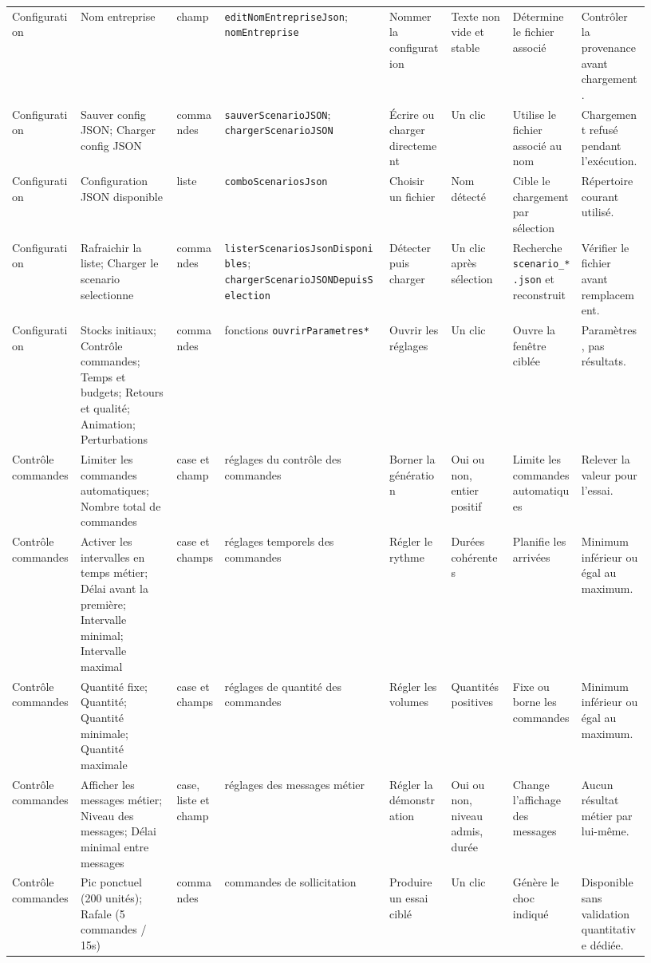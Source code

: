 \begin{landscape}
{\begin{longtable}{L{0.10\linewidth} L{0.14\linewidth} L{0.07\linewidth} L{0.24\linewidth} L{0.09\linewidth} L{0.09\linewidth} L{0.10\linewidth} L{0.10\linewidth}}
Configuration & Nom entreprise & champ & \texttt{editNomEntrepriseJson}; \texttt{nomEntreprise} & Nommer la configuration & Texte non vide et stable & Détermine le fichier associé & Contrôler la provenance avant chargement. \\
Configuration & Sauver config JSON; Charger config JSON & commandes & \texttt{sauverScenarioJSON}; \texttt{chargerScenarioJSON} & Écrire ou charger directement & Un clic & Utilise le fichier associé au nom & Chargement refusé pendant l'exécution. \\
Configuration & Configuration JSON disponible & liste & \texttt{comboScenariosJson} & Choisir un fichier & Nom détecté & Cible le chargement par sélection & Répertoire courant utilisé. \\
Configuration & Rafraichir la liste; Charger le scenario selectionne & commandes & \texttt{listerScenariosJsonDisponibles}; \texttt{chargerScenarioJSONDepuisSelection} & Détecter puis charger & Un clic après sélection & Recherche \texttt{scenario\_}\allowbreak\texttt{*.json} et reconstruit & Vérifier le fichier avant remplacement. \\

Configuration & Stocks initiaux; Contrôle commandes; Temps et budgets; Retours et qualité; Animation; Perturbations & commandes & fonctions \texttt{ouvrirParametres*} & Ouvrir les réglages & Un clic & Ouvre la fenêtre ciblée & Paramètres, pas résultats. \\
Contrôle commandes & Limiter les commandes automatiques; Nombre total de commandes & case et champ & réglages du contrôle des commandes & Borner la génération & Oui ou non, entier positif & Limite les commandes automatiques & Relever la valeur pour l'essai. \\
Contrôle commandes & Activer les intervalles en temps métier; Délai avant la première; Intervalle minimal; Intervalle maximal & case et champs & réglages temporels des commandes & Régler le rythme & Durées cohérentes & Planifie les arrivées & Minimum inférieur ou égal au maximum. \\
Contrôle commandes & Quantité fixe; Quantité; Quantité minimale; Quantité maximale & case et champs & réglages de quantité des commandes & Régler les volumes & Quantités positives & Fixe ou borne les commandes & Minimum inférieur ou égal au maximum. \\
Contrôle commandes & Afficher les messages métier; Niveau des messages; Délai minimal entre messages & case, liste et champ & réglages des messages métier & Régler la démonstration & Oui ou non, niveau admis, durée & Change l'affichage des messages & Aucun résultat métier par lui-même. \\
Contrôle commandes & Pic ponctuel (200 unités); Rafale (5 commandes / 15s) & commandes & commandes de sollicitation & Produire un essai ciblé & Un clic & Génère le choc indiqué & Disponible sans validation quantitative dédiée. \\


\end{longtable}}
\end{landscape}
